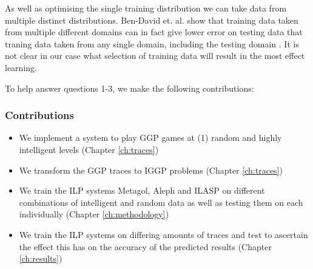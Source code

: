 As well as optimising the single training distribution we can take data from multiple distinct distributions. Ben-David et. al. show that training data taken from multiple different domains can in fact give lower error on testing data that traning data taken from any single domain, including the testing domain \cite{Ben-David/DifferentDomains}. It is not clear in our case what selection of training data will result in the most effect learning.

To help answer questions 1-3, we make the following contributions:

\subsubsection{Contributions}
\begin{itemize}
\item We implement a system to play GGP games at (1) random and highly intelligent levels (Chapter \ref{ch:traces})
\item We transform the GGP traces to IGGP problems (Chapter \ref{ch:traces})
\item We train the ILP systems Metagol, Aleph and ILASP on different combinations of intelligent and random data as well as testing them on each individually (Chapter \ref{ch:methodology})
\item We train the ILP systems on differing amounts of traces and test to ascertain the effect this has on the accuracy of the predicted results (Chapter \ref{ch:results})
\end{itemize}